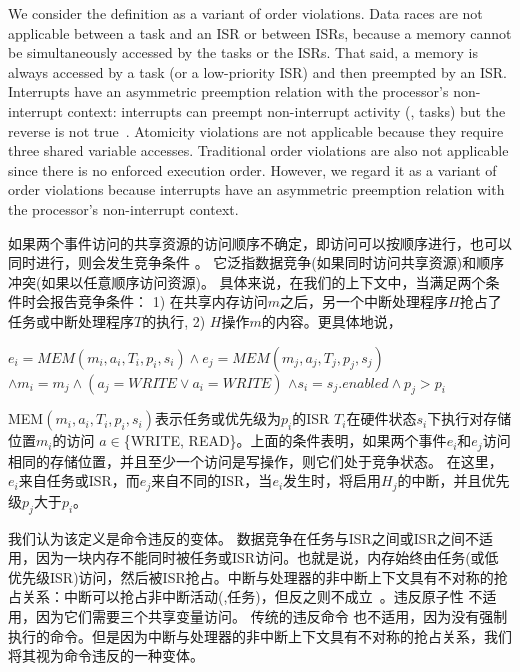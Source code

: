 We consider the definition as a variant of order violations.
Data races \cite{pratikakis2006locksmith} are not
applicable between a task and an ISR or between ISRs,
because a memory cannot be simultaneously accessed
by the tasks or the ISRs. That said, a memory is always 
accessed by a task (or a low-priority ISR) and then preempted by an ISR.
Interrupts have an asymmetric preemption relation with the processor's 
non-interrupt context: 
interrupts can preempt non-interrupt activity (\ie, tasks)
but the reverse is not true~\cite{Regehr05}. 
Atomicity violations  \cite{lu2008learning} are not applicable because they require three shared variable accesses.
Traditional order violations \cite{lu2008learning} are also not applicable since there is no enforced execution order.
However, we regard it as a variant of order violations because interrupts have an asymmetric preemption relation with the processor's non-interrupt context.


如果两个事件访问的共享资源的访问顺序不确定，即访问可以按顺序进行，也可以同时进行，则会发生竞争条件 \cite{vonPraun2011, netzer1992what}。
它泛指数据竞争(如果同时访问共享资源)和顺序冲突(如果以任意顺序访问资源)。
具体来说，在我们的上下文中，当满足两个条件时会报告竞争条件：
1) 在共享内存访问$m$之后，另一个中断处理程序$H$抢占了任务或中断处理程序$T$的执行, 2) $H$操作$m$的内容。更具体地说，
\begin{center}
	$\mathit{
		e_i = MEM (m_i, a_i, T_i, p_i, s_i) \wedge e_j = MEM (m_j,
		a_j, T_j, p_j, s_j)}$
	$\mathit{\wedge m_i = m_j \wedge  (a_j =
		WRITE \vee a_i = WRITE)}$
	$\mathit{  \wedge s_i = s_j.enabled \wedge p_j > p_i
	}$
\end{center}


\noindent
MEM$(m_i, a_i, T_i, p_i, s_i)$表示任务或优先级为$p_i$的ISR $T_i$在硬件状态$s_i$下执行对存储位置$m_i$的访问 $a \in $\{WRITE, READ\}。上面的条件表明，如果两个事件$e_i$和$e_j$访问相同的存储位置，并且至少一个访问是写操作，则它们处于竞争状态。 在这里，$e_i$来自任务或ISR，而$e_j$来自不同的ISR，当$e_i$发生时，将启用$H_j$的中断，并且优先级$p_j$大于$p_i$。

我们认为该定义是命令违反的变体。 数据竞争\cite{pratikakis2006locksmith}在任务与ISR之间或ISR之间不适用，因为一块内存不能同时被任务或ISR访问。也就是说，内存始终由任务(或低优先级ISR)访问，然后被ISR抢占。中断与处理器的非中断上下文具有不对称的抢占关系：中断可以抢占非中断活动(\ie,任务)，但反之则不成立~\cite{Regehr05}。违反原子性 \cite{lu2008learning} 不适用，因为它们需要三个共享变量访问。 传统的违反命令 \cite{lu2008learning} 也不适用，因为没有强制执行的命令。但是因为中断与处理器的非中断上下文具有不对称的抢占关系，我们将其视为命令违反的一种变体。


